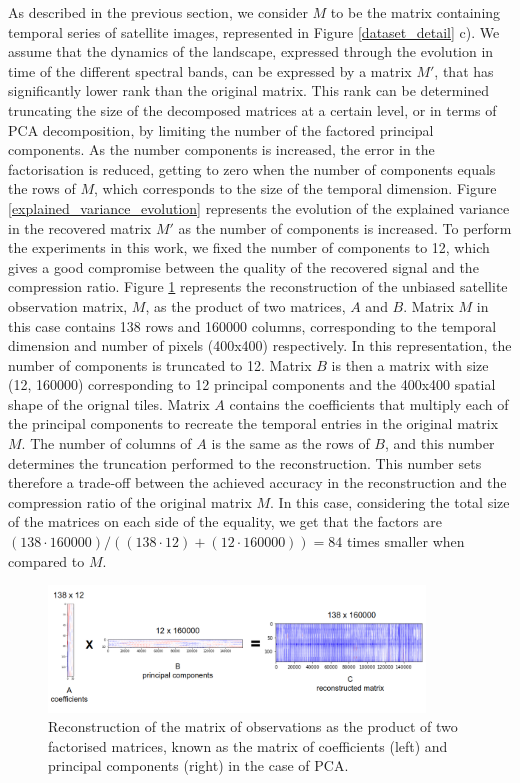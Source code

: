 \documentclass[essd, manuscript]{copernicus}
\begin{document}
As described in the previous section, we consider $M$ to be the matrix containing temporal series of satellite images, represented in Figure \ref{dataset_detail} c). We assume that the dynamics of the landscape, expressed through the evolution in time of the different spectral bands, can be expressed by a matrix $M'$, that has significantly lower rank than the original matrix. This rank can be determined truncating the size of the decomposed matrices at a certain level, or in terms of PCA decomposition, by limiting the number of the factored principal components. As the number components is increased, the error in the factorisation is reduced, getting to zero when the number of components equals the rows of $M$, which corresponds to the size of the temporal dimension. Figure \ref{explained_variance_evolution} represents the evolution of the explained variance in the recovered matrix $M'$ as the number of components is increased. To perform the experiments in this work, we fixed the number of components to 12, which gives a good compromise between the quality of the recovered signal and the compression ratio. 
Figure \ref{factorisation} represents the reconstruction of the unbiased satellite observation matrix, $M$, as the product of two matrices, $A$ and $B$. Matrix $M$ in this case contains 138 rows and 160000 columns, corresponding to the temporal dimension and number of pixels (400x400) respectively. In this representation, the number of components is truncated to 12. Matrix $B$ is then a matrix with size (12, 160000) corresponding to 12 principal components and the 400x400 spatial shape of the orignal tiles. Matrix $A$ contains the coefficients that multiply each of the principal components to recreate the temporal entries in the original matrix $M$. The number of columns of $A$ is the same as the rows of $B$, and this number determines the truncation performed to the reconstruction. This number sets therefore a trade-off between the achieved accuracy in the reconstruction and the compression ratio of the original matrix $M$. In this case, considering the total size of the matrices on each side of the equality, we get that the factors are $(138 \cdot 160000) / ((138 \cdot 12) + (12 \cdot 160000)) = 84 $ times smaller when compared to $M$. 

\begin{figure}%
    \includegraphics[width=10cm]{fig3.png}
	\caption{Reconstruction of the matrix of observations as the product of two factorised matrices, known as the matrix of coefficients (left) and principal components (right) in the case of PCA.}%
    \label{factorisation}%
\end{figure}
\end{document}
